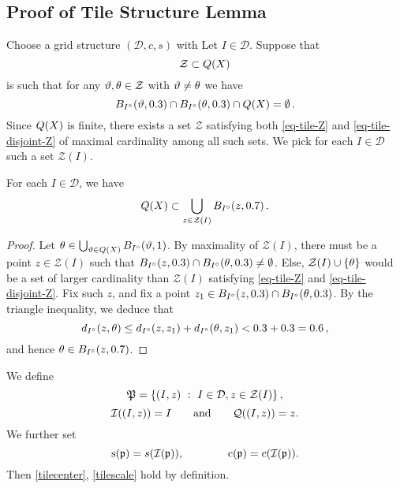 \subsection{Proof of Tile Structure Lemma}
\label{subsectiles}
Choose a grid structure $(\mathcal{D}, c, s)$ with 
Let $I \in \mathcal{D}$. Suppose that
\begin{equation}
    \label{eq-tile-Z}
    \mathcal{Z} \subset {Q}(X)
\end{equation}
is such that for any ${\vartheta}, {\theta} \in \mathcal{Z}$ with ${\vartheta}\ne {\theta}$ we have
\begin{equation}
    \label{eq-tile-disjoint-Z}
    B_{I^\circ}({\vartheta}, 0.3) \cap B_{I^\circ}({\theta}, 0.3) \cap {Q}(X) = \emptyset\,.
\end{equation}
Since ${Q}(X)$ is finite, there exists a set $\mathcal{Z}$ satisfying both \eqref{eq-tile-Z} and \eqref{eq-tile-disjoint-Z} of maximal cardinality among all such sets. We pick for each $I \in \mathcal{D}$ such a set $\mathcal{Z}(I)$.

\begin{lemma}
    \label{frequency-ball-cover}
    \leanok
    For each $I \in \mathcal{D}$, we have
    \begin{equation}
        \label{eq-tile-cover}
        {Q}(X) \subset \bigcup_{z \in \mathcal{Z}(I)} B_{I^\circ}(z, 0.7)\,.
    \end{equation}
\end{lemma}

\begin{proof}
    \leanok
    Let ${\theta} \in \bigcup_{{\vartheta} \in {Q}(X)} B_{I^\circ}({\vartheta}, 1)$. By maximality of $\mathcal{Z}(I)$, there must be a point $z \in \mathcal{Z}(I)$ such that $B_{I^\circ}(z, 0.3) \cap B_{I^\circ}({\theta}, 0.3) \ne \emptyset$. Else, $\mathcal{Z}(I) \cup \{{\theta}\}$ would be a set of larger cardinality than $\mathcal{Z}(I)$ satisfying \eqref{eq-tile-Z} and \eqref{eq-tile-disjoint-Z}. Fix such $z$, and fix a point $z_1 \in B_{I^\circ}(z, 0.3) \cap B_{I^\circ}({\theta}, 0.3)$. By the triangle inequality, we deduce that
    $$
        d_{I^\circ}(z,{\theta}) \le d_{I^\circ}(z,z_1) + d_{I^\circ}({\theta}, z_1) < 0.3 + 0.3 = 0.6\,,
    $$
    and hence ${\theta} \in B_{I^\circ}(z, 0.7)$.
\end{proof}

We define
$$
    {\mathfrak P} = \{(I, z) \ : \ I \in \mathcal{D}, z \in \mathcal{Z}(I)\}\,,
$$
$${\mathcal{I}}((I, z)) = I\qquad \text{and} \qquad {\mathcal{Q}}((I, z)) = z.$$ We further set $${\mathrm{s}}({\mathfrak p}) = s({\mathcal{I}}({\mathfrak p})),\qquad \qquad {\mathrm{c}}({\mathfrak p}) = c({\mathcal{I}}({\mathfrak p})).$$ Then \eqref{tilecenter}, \eqref{tilescale} hold by definition.

